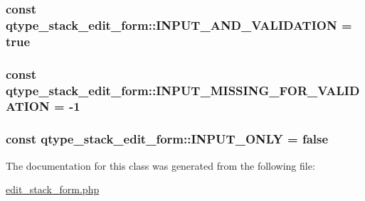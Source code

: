 \label{classqtype__stack__edit__form_a5858ef26f537b7e427e241402ee1f272}
\hypertarget{classqtype__stack__edit__form_a248e954e20f1b632d6add869e196ec3d}{
\subsubsection[{INPUT\_\-AND\_\-VALIDATION}]{\setlength{\rightskip}{0pt plus 5cm}const {\bf qtype\_\-stack\_\-edit\_\-form::INPUT\_\-AND\_\-VALIDATION} = true}}
\label{classqtype__stack__edit__form_a248e954e20f1b632d6add869e196ec3d}
\hypertarget{classqtype__stack__edit__form_a9eb08a24f442c2c37019fbc69f6120ee}{
\subsubsection[{INPUT\_\-MISSING\_\-FOR\_\-VALIDATION}]{\setlength{\rightskip}{0pt plus 5cm}const {\bf qtype\_\-stack\_\-edit\_\-form::INPUT\_\-MISSING\_\-FOR\_\-VALIDATION} = -\/1}}
\label{classqtype__stack__edit__form_a9eb08a24f442c2c37019fbc69f6120ee}
\hypertarget{classqtype__stack__edit__form_ad1239476262959653827524c32eb91ae}{
\subsubsection[{INPUT\_\-ONLY}]{\setlength{\rightskip}{0pt plus 5cm}const {\bf qtype\_\-stack\_\-edit\_\-form::INPUT\_\-ONLY} = false}}
\label{classqtype__stack__edit__form_ad1239476262959653827524c32eb91ae}


The documentation for this class was generated from the following file:\begin{DoxyCompactItemize}
\item 
\hyperlink{edit__stack__form_8php}{edit\_\-stack\_\-form.php}\end{DoxyCompactItemize}
